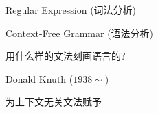 





\begin{frame}{}
  \begin{center}
    Regular Expression (词法分析)

    \vspace{1.00cm}
    Context-Free Grammar (语法分析)

    \pause
    \vspace{1.00cm}
    {用什么样的文法刻画语言的?}
  \end{center}
\end{frame}

\begin{frame}{}

  \begin{center}
    Donald Knuth ($1938 \sim$)
  \end{center}
\end{frame}

\begin{frame}{}

  \begin{center}
     为上下文无关文法赋予
  \end{center}
\end{frame}

